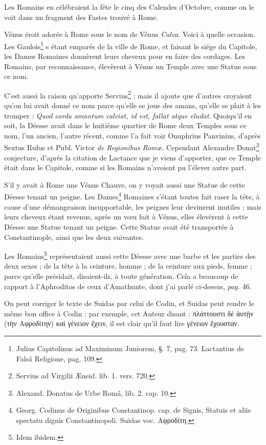 \documentclass[a4paper, 18pt, oneside]{article}
\begin{document}
Les Romains en célébraient la fête le cinq des Calendes d'Octobre, comme on le voit dans un fragment des Fastes trouvé à Rome.

Vénus éroit adorée à Rome sous le nom de Vénus \emph{Calva}. Voici à quelle occasion. Les Gaulois\footnote{Julius Capitolinus ad Maximinum Juniorem, §. 7, pag. 73. Lactantius de Falsâ Religione, pag. 109.} s étant emparés de la ville de Rome, et faisant le siége du Capitole, les Dames Romaines donnèrent leurs cheveux pour en faire des cordages. Les Romains, par reconnaissance, élevèrent à Vénus un Temple avec une Statue sous ce nom.

C'est aussi la raison qu'apporte Servius\footnote{Servius ad Virgilii Æneid. lib. 1. vers. 720.} ; mais il ajoute que d'autres croyaient qu'on lui avait donné ce nom parce qu'elle se joue des amans, qu'elle se plait à les tromper : \emph{Quod corda amantum calviat, id est, fallat atque eludat}. Quoiqu'il en soit, la Déesse avait dans le huitième quartier de Rome deux Temples sous ce nom, l'un ancien, l'autre récent, comme l'a fait voir Onuphrius Panvinius, d'après Sextus Rufus et Publ. Victor \emph{de Regionibus Romæ}. Cependant Alexandre Donat\footnote{Alexand. Donatus de Urbe Româ, lib. 2. cap. 10.} conjecture, d'après la citation de Lactance que je viens d'apporter, que ce Temple était dans le Capitole, comme si les Romains n'avoient pu l'élever autre part.

S'il y avait à Rome une Vénus Chauve, on y voyait aussi une Statue de cette Déesse tenant un peigne. Les Dames\footnote{Georg. Codinus de Originibus Constantinop. cap. de Signis, Statuis et aliis spectatu dignis Constantinopoli. Suidas voc. Αφροδίτη.} Romaines s'étant toutes fait raser la tête, à cause d'une démangeaison insupportable, les peignes leur devinrent inutiles ; mais leurs cheveux étant revenus, après un vœu fait à Vénus, elles élevèrent à cette Déesse une Statue tenant un peigne. Cette Statue avait été transportée à Constantinople, ainsi que les deux suivantes.

Les Romains\footnote{Idem ibidem.} représentaient aussi cette Déesse avec une barbe et les parties des deux sexes ; de la tête à la ceinture, homme ; de la ceinture aux pieds, femme ; parce qu'elle présidait, disaient-ils, à toute génération. Cela a beaucoup de rapport à l'Aphroditos de ceux d'Amathunte, dont j'ai parlé ci-dessus, \emph{pag.} 46.

On peut corriger le texte de Suidas par celui de Codin, et Suidas peut rendre le même bon office à Codin : par exemple, cet Auteur disant : πλάττουστι δὲ ἀυτῂν (τὴν Αφροδίτην) καὶ γένειον ἔχειν, il est clair qu'il faut lire γένειον ἔχουσταν.
\end{document}
